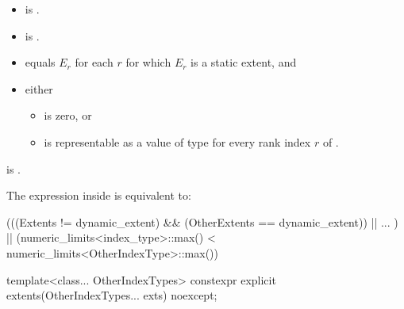 \begin{itemdescr}
\pnum
\constraints
\begin{itemize}
\item
{} is .
\item
{} is .
\end{itemize}

\pnum
\expects
\begin{itemize}
\item
{} equals $E_r$
for each $r$ for which $E_r$ is a static extent, and
\item
either
\begin{itemize}
\item
{} is zero, or
\item
{} is representable as
a value of type  for every rank index $r$ of .
\end{itemize}
\end{itemize}

\pnum
\ensures
{} is .

\pnum
\remarks
The expression inside  is equivalent to:
\begin{codeblock}
(((Extents != dynamic_extent) && (OtherExtents == dynamic_extent)) || ... ) ||
(numeric_limits<index_type>::max() < numeric_limits<OtherIndexType>::max())
\end{codeblock}
\end{itemdescr}

%
\begin{itemdecl}
template<class... OtherIndexTypes>
  constexpr explicit extents(OtherIndexTypes... exts) noexcept;
\end{itemdecl}

